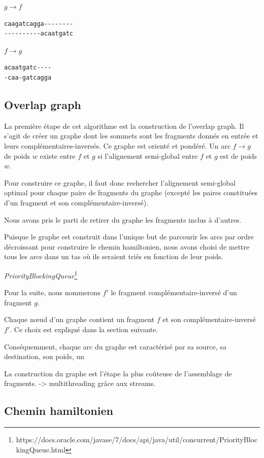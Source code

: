 \documentclass{article}
\begin{document}
$g \to f$
\begin{verbatim}
caagatcagga--------
----------acaatgatc
\end{verbatim}

$f \to g$
\begin{verbatim}
acaatgatc----
-caa-gatcagga
\end{verbatim}

\subsection{Overlap graph}

La première étape de cet algorithme est la construction de l'overlap graph. Il s'agit de créer un graphe dont les sommets sont les fragments donnés en entrée et leurs complémentaires-inversés. Ce graphe est orienté et pondéré. Un arc $f\to g$ de poids $w$ existe entre $f$ et $g$ si l'alignement semi-global entre $f$ et $g$ est de poids $w$.

Pour construire ce graphe, il faut donc rechercher l'alignement semi-global optimal pour chaque paire de fragments du graphe (excepté les paires constituées d'un fragment et son complémentaire-inversé).

Nous avons pris le parti de retirer du graphe les fragments inclus à d'autres.

Puisque le graphe est construit dans l'unique but de parcourir les arcs par ordre décroissant pour construire le chemin hamiltonien, nous avons choisi de mettre tous les arcs dans un tas où ils seraient triés en fonction de leur poids.

\textit{PriorityBlockingQueue}\footnote{https://docs.oracle.com/javase/7/docs/api/java/util/concurrent/PriorityBlockingQueue.html}

Pour la suite, nous nommerons $f'$ le fragment complémentaire-inversé d'un fragment $g$. 

Chaque nœud d'un graphe contient un fragment $f$ et son complémentaire-inversé $f'$. Ce choix est expliqué dans la section suivante.

Conséquemment, chaque arc du graphe est caractérisé par sa source, sa destination, son poids, un

La construction du graphe est l'étape la plus coûteuse de l'assemblage de fragments. -> multithreading grâce aux streams.



\subsection{Chemin hamiltonien}
\end{document}

